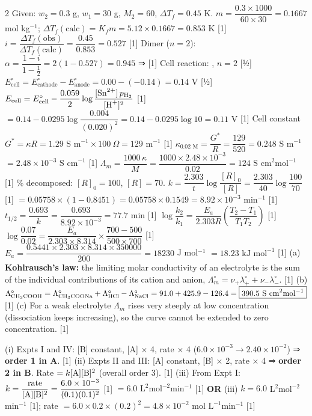 \documentclass[10pt,a4paper]{extarticle}
\newcommand{\mk}[1]{{\scriptsize\color{black!55}[#1]}}
\begin{document}
\begin{multicols}{2}
\An Given: $w_2=0.3$ g, $w_1=30$ g, $M_2=60$, $\Delta T_f=0.45$ K.\nl
$m=\dfrac{0.3\times1000}{60\times30}=0.1667$ mol kg$^{-1}$;\; $\Delta T_f(\text{calc})=K_fm=5.12\times0.1667=0.853$ K \mk{1}\nl
$i=\dfrac{\Delta T_f(\text{obs})}{\Delta T_f(\text{calc})}=\dfrac{0.45}{0.853}=\boxed{0.527}$ \mk{1}\nl
Dimer ($n=2$): $\alpha=\dfrac{1-i}{1-\frac12}=2(1-0.527)=0.945$ ⇒  \mk{1}
\An Cell reaction: , $n=2$ \mk{½}\nl
$E^\circ_\text{cell}=E^\circ_\text{cathode}-E^\circ_\text{anode}=0.00-(-0.14)=0.14$ V \mk{½}\nl
$E_\text{cell}=E^\circ_\text{cell}-\dfrac{0.059}{2}\log\dfrac{[\ce{Sn^2+}]\,p_{\ce{H2}}}{[\ce{H+}]^2}$ \mk{1}\nl
$=0.14-0.0295\log\dfrac{0.004}{(0.020)^2}=0.14-0.0295\log10=\boxed{0.11\text{ V}}$ \mk{1}
\An Cell constant $G^*=\kappa R=1.29$ S m$^{-1}\times100\ \Omega=129$ m$^{-1}$ \mk{1}\nl
$\kappa_{0.02\text{ M}}=\dfrac{G^*}{R}=\dfrac{129}{520}=0.248$ S m$^{-1}$ $=\boxed{2.48\times10^{-3}\text{ S cm}^{-1}}$ \mk{1}\nl
$\Lambda_m=\dfrac{1000\,\kappa}{M}=\dfrac{1000\times2.48\times10^{-3}}{0.02}=\boxed{124\text{ S cm}^2\text{mol}^{-1}}$ \mk{1}
\% decomposed: $[R]_0=100$, $[R]=70$.\nl
$k=\dfrac{2.303}{t}\log\dfrac{[R]_0}{[R]}=\dfrac{2.303}{40}\log\dfrac{100}{70}$ \mk{1}\nl
$=0.05758\times(1-0.8451)=0.05758\times0.1549=8.92\times10^{-3}$ min$^{-1}$ \mk{1}\nl
$t_{1/2}=\dfrac{0.693}{k}=\dfrac{0.693}{8.92\times10^{-3}}=\boxed{77.7\text{ min}}$ \mk{1}
\An $\log\dfrac{k_2}{k_1}=\dfrac{E_a}{2.303R}\left(\dfrac{T_2-T_1}{T_1T_2}\right)$ \mk{1}\nl
$\log\dfrac{0.07}{0.02}=\dfrac{E_a}{2.303\times8.314}\times\dfrac{700-500}{500\times700}$ \mk{1}\nl
$E_a=\dfrac{0.5441\times2.303\times8.314\times350000}{200}=18230$ J mol$^{-1}$ $=\boxed{18.23\text{ kJ mol}^{-1}}$ \mk{1}
\An (a) \textbf{Kohlrausch's law:} the limiting molar conductivity of an electrolyte is the sum of the individual contributions of its cation and anion, $\Lambda_m^\circ=\nu_+\lambda_+^\circ+\nu_-\lambda_-^\circ$. \mk{1}\nl
(b) $\Lambda^\circ_{\ce{CH3COOH}}=\Lambda^\circ_{\ce{CH3COONa}}+\Lambda^\circ_{\ce{HCl}}-\Lambda^\circ_{\ce{NaCl}}=91.0+425.9-126.4=\boxed{390.5\text{ S cm}^2\text{mol}^{-1}}$ \mk{1}\nl
(c) For a weak electrolyte $\Lambda_m$ rises very steeply at low concentration (dissociation keeps increasing), so the curve cannot be extended to zero concentration. \mk{1}

\An (i) Expts I and IV: [B] constant, [A] × 4, rate × 4 ($6.0\times10^{-3}\to2.40\times10^{-2}$) ⇒ \textbf{order 1 in A}. \mk{1}\nl
(ii) Expts II and III: [A] constant, [B] × 2, rate × 4 ⇒ \textbf{order 2 in B}. Rate $=k[\ce A][\ce B]^2$ (overall order 3). \mk{1}\nl
(iii) From Expt I: $k=\dfrac{\text{rate}}{[\ce A][\ce B]^2}=\dfrac{6.0\times10^{-3}}{(0.1)(0.1)^2}$ \mk{1} $=\boxed{6.0\text{ L}^2\text{mol}^{-2}\text{min}^{-1}}$ \mk{1}\nl
\textbf{OR} (iii) $k=6.0$ L$^2$mol$^{-2}$min$^{-1}$ \mk{1}; rate $=6.0\times0.2\times(0.2)^2=\boxed{4.8\times10^{-2}\text{ mol L}^{-1}\text{min}^{-1}}$ \mk{1}


\end{multicols}
\end{document}
